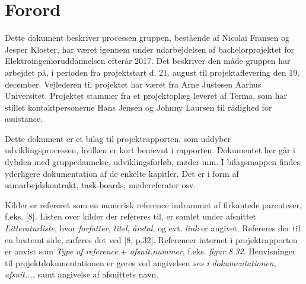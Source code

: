 \chapter{Forord}
Dette dokument beskriver processen gruppen, bestående af Nicolai Fransen og Jesper Kloster, har været igennem under udarbejdelsen af bachelorprojektet for Elektroingeniøruddannelsen efterår 2017. Det beskriver den måde gruppen har arbejdet på, i perioden fra projektstart d. 21. august til projektaflevering den 19. december. Vejlederen til projektet har været fra Arne Justesen Aarhus Universitet. Projektet stammer fra et projektoplæg leveret af Terma, som har stillet kontaktpersonerne Hans Jensen og Johnny Laursen til rådighed for assistance.

Dette dokument er et bilag til projektrapporten, som uddyber udviklingsprocessen, hvilken er kort benævnt i rapporten. Dokumentet her går i dybden med gruppedannelse, udviklingsforløb, møder mm. I bilagsmappen findes yderligere dokumentation af de enkelte kapitler. Det er i form af samarbejdskontrakt, task-boards, mødereferater osv.     

Kilder er refereret som en numerisk reference indrammet af firkantede parenteser, f.eks. [8]. Listen over kilder der refereres til, er samlet under afsnittet \textit{Litteraturliste}, hvor \textit{forfatter}, \textit{titel}, \textit{årstal}, og evt. \textit{link} er angivet. Refereres der til en bestemt side, anføres det ved [8, p.32]. Referencer internet i projektrapporten er anvist som \textit{Type af reference} + \textit{afsnit.nummer}, f.eks. \textit{figur 8.32}. Henvisninger til projektdokumentationen er gøres ved  angivelsen \textit{ses i dokumentationen, afsnit...}, samt angivelse af afsnittets navn.